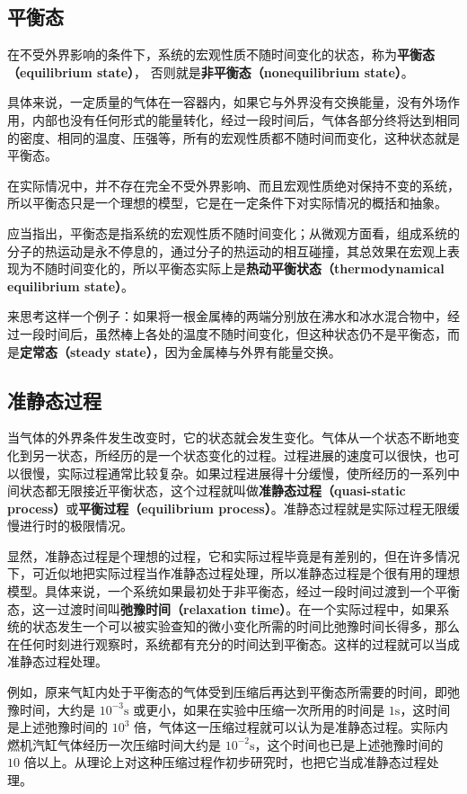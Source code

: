 
\subsection{平衡态}

在不受外界影响的条件下，系统的宏观性质不随时间变化的状态，称为\textbf{平衡态（equilibrium state）}， 否则就是\textbf{非平衡态（nonequilibrium state）}。

具体来说，一定质量的气体在一容器内，如果它与外界没有交换能量，没有外场作用，内部也没有任何形式的能量转化，经过一段时间后，气体各部分终将达到相同的密度、相同的温度、压强等，所有的宏观性质都不随时间而变化，这种状态就是平衡态。

在实际情况中，并不存在完全不受外界影响、而且宏观性质绝对保持不变的系统，所以平衡态只是一个理想的模型，它是在一定条件下对实际情况的概括和抽象。

应当指出，平衡态是指系统的宏观性质不随时间变化；从微观方面看，组成系统的分子的热运动是永不停息的，通过分子的热运动的相互碰撞，其总效果在宏观上表现为不随时间变化的，所以平衡态实际上是\textbf{热动平衡状态（thermodynamical equilibrium state）}。

来思考这样一个例子：如果将一根金属棒的两端分别放在沸水和冰水混合物中，经过一段时间后，虽然棒上各处的温度不随时间变化，但这种状态仍不是平衡态，而是\textbf{定常态（steady state）}，因为金属棒与外界有能量交换。

\subsection{准静态过程}

当气体的外界条件发生改变时，它的状态就会发生变化。气体从一个状态不断地变化到另一状态，所经历的是一个状态变化的过程。过程进展的速度可以很快，也可以很慢，实际过程通常比较复杂。如果过程进展得十分缓慢，使所经历的一系列中间状态都无限接近平衡状态，这个过程就叫做\textbf{准静态过程（quasi-static process）}或\textbf{平衡过程（equilibrium process）}。准静态过程就是实际过程无限缓慢进行时的极限情况。

显然，准静态过程是个理想的过程，它和实际过程毕竟是有差别的，但在许多情况下，可近似地把实际过程当作准静态过程处理，所以准静态过程是个很有用的理想模型。具体来说，一个系统如果最初处于非平衡态，经过一段时间过渡到一个平衡态，这一过渡时间叫\textbf{弛豫时间（relaxation time）}。在一个实际过程中，如果系统的状态发生一个可以被实验查知的微小变化所需的时间比弛豫时间长得多，那么在任何时刻进行观察时，系统都有充分的时间达到平衡态。这样的过程就可以当成准静态过程处理。

例如，原来气缸内处于平衡态的气体受到压缩后再达到平衡态所需要的时间，即弛豫时间，大约是 $10^{-3}\mathrm s$ 或更小，如果在实验中压缩一次所用的时间是 $1\mathrm s$，这时间是上述弛豫时间的 $10^3$ 倍，气体这一压缩过程就可以认为是准静态过程。实际内燃机汽缸气体经历一次压缩时间大约是 $10^{-2}\mathrm s$，这个时间也已是上述弛豫时间的 $10$ 倍以上。从理论上对这种压缩过程作初步研究时，也把它当成准静态过程处理。
